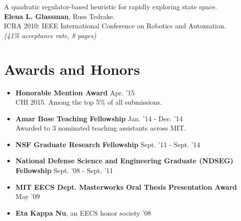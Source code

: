 \documentclass[margin]{res}
\begin{document}
\begin{resume}
A quadratic regulator-based heuristic for rapidly exploring state space.\\
{\bf Elena L. Glassman}, Russ Tedrake.\\
ICRA 2010: IEEE International Conference on Robotics and Automation.\\ 
{\it (41\% acceptance rate, 8 pages)}








\section{Awards and Honors} 

\begin{itemize}[leftmargin=*] \itemsep -2pt
\item {\bf Honorable Mention Award} \hfill Apr. '15
\\CHI 2015. Among the top 5\% of all submissions.

\item {\bf Amar Bose Teaching Fellowship} \hfill Jan. '14 - Dec. '14 \\Awarded to 3 nominated teaching assistants across MIT. 

\item {\bf NSF Graduate Research Fellowship} \hfill Sept. '11 - Sept. '14

\item {\bf National Defense Science and Engineering Graduate (NDSEG) \\ Fellowship} \hfill Sept. '08 - Sept. '11
          
\item {\bf MIT EECS Dept. Masterworks Oral Thesis Presentation Award} \hfill May '09   

\item {\bf Eta Kappa Nu}, an EECS honor society \hfill '08


\end{itemize}
\end{resume}
\end{document}
